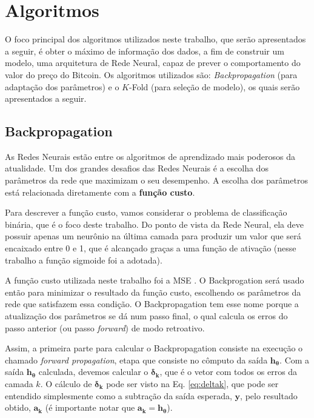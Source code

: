 \section{Algoritmos}
\label{sec:algoritmos}
O foco principal dos algoritmos utilizados neste trabalho, que serão apresentados a seguir, é obter o máximo de informação dos dados, a fim de construir um modelo, uma arquitetura de Rede Neural, capaz de prever o comportamento do valor do preço do Bitcoin. Os algoritmos utilizados são: \emph{Backpropagation} (para adaptação dos parâmetros) e o $K$-Fold (para seleção de modelo), os quais serão apresentados a seguir.
 
\subsection{Backpropagation}
\label{subsec:backpropagation}

 As Redes Neurais estão entre os algoritmos de aprendizado mais poderosos da atualidade. Um dos grandes desafios das Redes Neurais é a escolha dos parâmetros da rede que maximizam o seu desempenho. A escolha dos parâmetros está relacionada diretamente com a \textbf{função custo}.
 
 Para descrever a função custo, vamos considerar o problema de classificação binária, que é o foco deste trabalho. Do ponto de vista da Rede Neural, ela deve possuir apenas um neurônio na última camada para produzir um valor que será encaixado entre 0 e 1, que é alcançado graças a uma função de ativação (nesse trabalho a função sigmoide foi a adotada).
 
 A função custo utilizada neste trabalho foi a MSE \cite{lehmann2006theory}. O Backprogation será usado então para minimizar o resultado da função custo, escolhendo os parâmetros da rede que satisfazem essa condição. O Backpropagation tem esse nome porque a atualização dos parâmetros se dá num passo final, o qual calcula os erros do passo anterior (ou passo \textit{forward}) de modo retroativo.
 
 Assim, a primeira parte para calcular o Backpropagation consiste na execução o chamado \textit{forward propagation}, etapa que consiste no cômputo da saída $\mathbf{h_\theta}$. Com a saída $\mathbf{h_\theta}$ calculada, devemos calcular o $\mathbf{\delta_k}$, que é o vetor com todos os erros da camada $k$. O cálculo de $\mathbf{\delta_k}$ pode ser visto na Eq. \eqref{eq:deltak}, que pode ser entendido simplesmente como a subtração da saída esperada,  $\mathbf{y}$, pelo resultado obtido, $\mathbf{a_k}$ (é importante notar que $\mathbf{a_k} = \mathbf{h_\theta}$). 
 
